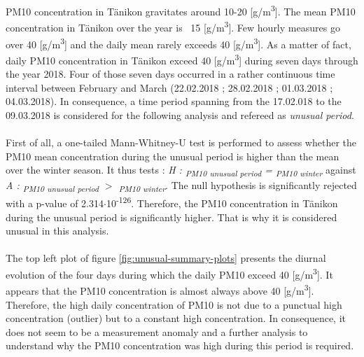 \documentclass[a4paper, 12pt]{article}
\begin{document}
    PM10 concentration in Tänikon gravitates around 10-20 [\textmu g/m\textsuperscript{3}]. The mean PM10 concentration in Tänikon over the year is ~15 [\textmu g/m\textsuperscript{3}]. Few hourly measures go over 40 [\textmu g/m\textsuperscript{3}] and the daily mean rarely exceeds 40 [\textmu g/m\textsuperscript{3}]. As a matter of fact, daily PM10 concentration in Tänikon exceed 40 [\textmu g/m\textsuperscript{3}] during seven days through the year 2018. Four of those seven days occurred in a rather continuous time interval between February and March (22.02.2018 ; 28.02.2018 ; 01.03.2018 ; 04.03.2018). In consequence, a time period spanning from the 17.02.018 to the 09.03.2018 is considered for the following analysis and refereed as \textit{unusual period}. 
    \\
    \\
    First of all, a one-tailed Mann-Whitney-U test is performed to assess whether the PM10 mean concentration during the unusual period is higher than the mean over the winter season. It thus tests : \textit{H : \textmu \textsubscript{PM10 unusual period} = \textmu \textsubscript{PM10 winter}} against \textit{A : \textmu \textsubscript{PM10 unusual period} $>$ \textmu \textsubscript{PM10 winter}}. The null hypothesis is significantly rejected with a p-value of 2.314$\cdot$10\textsuperscript{-126}. Therefore, the PM10 concentration in Tänikon during the unusual period is significantly higher. That is why it is considered unusual in this analysis. 
    \\
    \\
    The top left plot of figure \ref{fig:unusual-summary-plots} presents the diurnal evolution of the four days during which the daily PM10 exceed 40 [\textmu g/m\textsuperscript{3}]. It appears that the PM10 concentration is almost always above 40 [\textmu g/m\textsuperscript{3}]. Therefore, the high daily concentration of PM10 is not due to a punctual high concentration (outlier) but to a constant high concentration. In consequence, it does not seem to be a measurement anomaly and a further analysis to understand why the PM10 concentration was high during this period is required.
    \\
\end{document}
